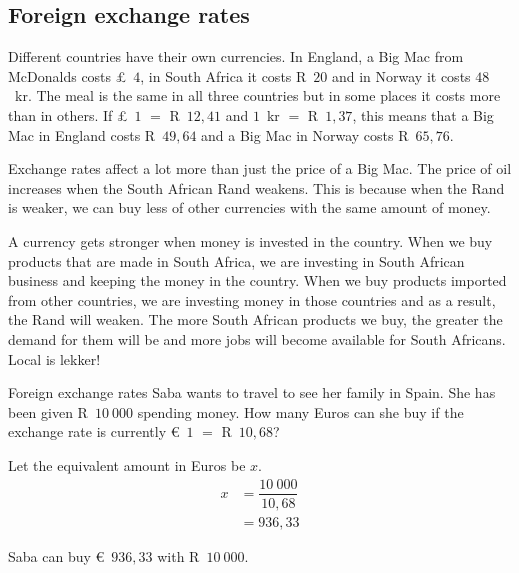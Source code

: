 \subsection{Foreign exchange rates}

Different countries have their own currencies. In England, a Big Mac
from McDonalds costs £~$4$, in South Africa it costs R~$20$ and in
Norway it costs $48$~kr. The meal is the same in all three countries
but in some places it costs more than in others. If £~$1$ $=$
R~$12,41$ and $1$~kr $=$ R~$1,37$, this means that a Big Mac in
England costs R~$49,64$ and a Big Mac in Norway costs R~$65,76$.

Exchange rates affect a lot more than just the price of a Big Mac. The price of oil increases when the South African Rand weakens. This is because when the Rand is weaker, we can buy less of other currencies with the same amount of money.

A currency gets stronger when money is invested in the country. When we buy products that are made in South Africa, we are investing in South African business and keeping the money in the country. When we buy products imported from other countries, we are investing money in those countries and as a result, the Rand will weaken. The more South African products we buy, the greater the demand for them will be and more jobs will become available for South Africans. Local is lekker!

\begin{wex}{Foreign exchange rates}
    {Saba wants to travel to see her family in Spain. She has been given R~$10~000$ spending money. How many Euros can she buy if the exchange rate is currently €~$1$ $=$ R~$10,68$?}{
Let the equivalent amount in Euros be $x$.
\begin{align*}
 x &= \dfrac{10~000}{10,68}\\
&= 936,33
\end{align*}

    Saba can buy €~$936,33$ with R~$10~000$.
}
\end{wex}



